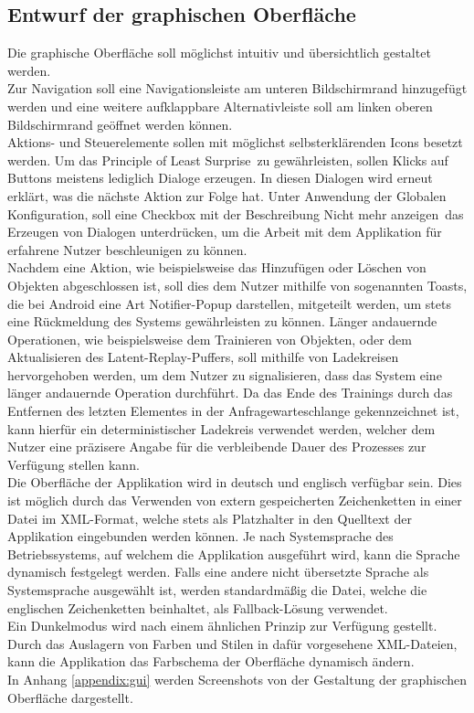 \documentclass[oneside]{ausarbeitung}
\begin{document}
\subsection{Entwurf der graphischen Oberfläche}
Die graphische Oberfläche soll möglichst intuitiv und übersichtlich gestaltet werden.\\
Zur Navigation soll eine Navigationsleiste am unteren Bildschirmrand hinzugefügt werden und eine weitere aufklappbare Alternativleiste soll am linken oberen Bildschirmrand geöffnet werden können.\\
Aktions- und Steuerelemente sollen mit möglichst selbsterklärenden Icons besetzt werden. Um das \glqq Principle of Least Surprise\grqq\ zu gewährleisten, sollen Klicks auf Buttons meistens lediglich Dialoge erzeugen. In diesen Dialogen wird erneut erklärt, was die nächste Aktion zur Folge hat. Unter Anwendung der Globalen Konfiguration, soll eine Checkbox mit der Beschreibung \glqq Nicht mehr anzeigen\grqq\ das Erzeugen von Dialogen unterdrücken, um die Arbeit mit dem Applikation für erfahrene Nutzer beschleunigen zu können.\\
Nachdem eine Aktion, wie beispielsweise das Hinzufügen oder Löschen von Objekten abgeschlossen ist, soll dies dem Nutzer mithilfe von sogenannten Toasts, die bei Android eine Art Notifier-Popup darstellen, mitgeteilt werden, um stets eine Rückmeldung des Systems gewährleisten zu können. Länger andauernde Operationen, wie beispielsweise dem Trainieren von Objekten, oder dem Aktualisieren des Latent-Replay-Puffers, soll mithilfe von Ladekreisen hervorgehoben werden, um dem Nutzer zu signalisieren, dass das System eine länger andauernde Operation durchführt. Da das Ende des Trainings durch das Entfernen des letzten Elementes in der Anfragewarteschlange gekennzeichnet ist, kann hierfür ein deterministischer Ladekreis verwendet werden, welcher dem Nutzer eine präzisere Angabe für die verbleibende Dauer des Prozesses zur Verfügung stellen kann.\\
Die Oberfläche der Applikation wird in deutsch und englisch verfügbar sein. Dies ist möglich durch das Verwenden von extern gespeicherten Zeichenketten in einer Datei im XML-Format, welche stets als Platzhalter in den Quelltext der Applikation eingebunden werden können. Je nach Systemsprache des Betriebssystems, auf welchem die Applikation ausgeführt wird, kann die Sprache dynamisch festgelegt werden. Falls eine andere nicht übersetzte Sprache als Systemsprache ausgewählt ist, werden standardmäßig die Datei, welche die englischen Zeichenketten beinhaltet, als Fallback-Lösung verwendet.\\
Ein Dunkelmodus wird nach einem ähnlichen Prinzip zur Verfügung gestellt. Durch das Auslagern von Farben und Stilen in dafür vorgesehene XML-Dateien, kann die Applikation das Farbschema der Oberfläche dynamisch ändern.\\
In Anhang \ref{appendix:gui} werden Screenshots von der Gestaltung der graphischen Oberfläche dargestellt.
\end{document}
